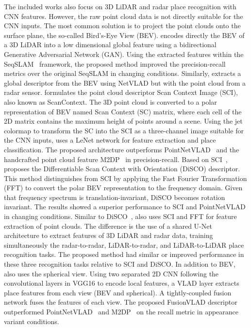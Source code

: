The included works also focus on 3D LiDAR and radar place recognition with CNN features. However, the raw point cloud data is not directly suitable for the CNN inputs. The most common solution is to project the point clouds onto the surface plane, the so-called Bird's-Eye View (BEV).
\cite{yin-et-al:2018:8593562} encodes directly the BEV of a 3D LiDAR into a low dimensional global feature using a bidirectional Generative Adversarial Network (GAN). Using the extracted features within the SeqSLAM~\parencite{discussion:seqslam} framework, the proposed method improved the precision-recall metrics over the original SeqSLAM in changing conditions.
Similarly, \cite{martini-et-al:2020:s20216002} extracts a global descriptor from the BEV using NetVLAD but with the point cloud from a radar sensor.
\cite{kim-et-al:2019:2897340} formulates the point cloud descriptor Scan Context Image (SCI), also known as ScanContext. The 3D point cloud is converted to a polar representation of BEV named Scan Context (SC) matrix, where each cell of the 2D matrix contains the maximum height of points around a scene. Using the jet colormap to transform the SC into the SCI as a three-channel image suitable for the CNN inputs, \cite{kim-et-al:2019:2897340} uses a LeNet network for feature extraction and place classification. The proposed architecture outperforms PointNetVLAD~\parencite{discussion:pointnetvlad} and the handcrafted point cloud feature M2DP~\parencite{discussion:m2dp} in precision-recall.
Based on SCI~\parencite{kim-et-al:2019:2897340}, \cite{xu-et-al:2021:3060741} proposes the Differentiable Scan Context with Orientation (DiSCO) descriptor. This method distinguishes from SCI by applying the Fast Fourier Transformation (FFT) to convert the polar BEV representation to the frequency domain. Given that frequency spectrum is translation-invariant, DiSCO becomes rotation invariant. The results showed a superior performance to SCI and PointNetVLAD in changing conditions.
Similar to DiSCO~\parencite{xu-et-al:2021:3060741}, \cite{yin-et-al:2021:661199} also uses SCI and FFT for feature extraction of point clouds. The difference is the use of a shared U-Net architecture to extract features of 3D LiDAR and radar data, training simultaneously the radar-to-radar, LiDAR-to-radar, and LiDAR-to-LiDAR place recognition tasks. The proposed method had similar or improved performance in these three recognition tasks relative to SCI and DiSCO.
In addition to BEV, \cite{yin-et-al:2021:3061375} also uses the spherical view. Using two separated 2D CNN following the convolutional layers in VGG16 to encode local features, a VLAD layer extracts place features from each view (BEV and spherical). A tightly-coupled fusion network fuses the features of each view. The proposed FusionVLAD descriptor outperformed PointNetVLAD~\parencite{discussion:pointnetvlad} and M2DP~\parencite{discussion:m2dp} on the recall metric in appearance variant conditions.

